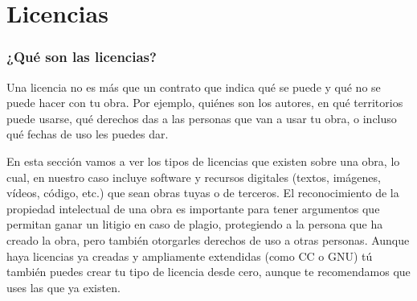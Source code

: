 \appendix
\chapter{Licencias} \label{anexo:licencias}
\subsection{¿Qué son las licencias?}

Una licencia no es más que un contrato que indica qué se puede y qué no se puede hacer con tu obra. Por ejemplo, quiénes son los autores, en qué territorios puede usarse, qué derechos das a las personas que van a usar tu obra, o incluso qué fechas de uso les puedes dar. 

En esta sección vamos a ver los tipos de licencias que existen sobre una obra, lo cual, en nuestro caso incluye software y recursos digitales (textos, imágenes, vídeos, código, etc.) que sean obras tuyas o de terceros. El reconocimiento de la propiedad intelectual de una obra es importante para tener argumentos que permitan ganar un litigio en caso de plagio, protegiendo a la persona que ha creado la obra, pero también otorgarles derechos de uso a otras personas. Aunque haya licencias ya creadas y ampliamente extendidas (como CC o GNU) tú también puedes crear tu tipo de licencia desde cero, aunque te recomendamos que uses las que ya existen.
